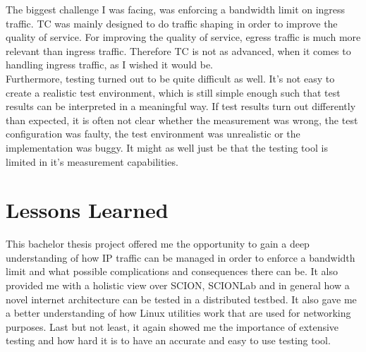 The biggest challenge I was facing, was enforcing a bandwidth limit on ingress traffic. \acs{TC} was mainly designed to do traffic shaping in order to improve the quality of service. For improving the quality of service, egress traffic is much more relevant than ingress traffic. Therefore \acs{TC} is not as advanced, when it comes to handling ingress traffic, as I wished it would be.
\\
Furthermore, testing turned out to be quite difficult as well. It's not easy to create a realistic test environment, which is still simple enough such that test results can be interpreted in a meaningful way. If test results turn out differently than expected, it is often not clear whether the measurement was wrong, the test configuration was faulty, the test environment was unrealistic or the implementation was buggy. It might as well just be that the testing tool is limited in it's measurement capabilities. 

\section{Lessons Learned}

This bachelor thesis project offered me the opportunity to gain a deep understanding of how \acs{IP} traffic can be managed in order to enforce a bandwidth limit and what possible complications and consequences there can be. It also provided me with a holistic view over \acs{SCION}, \acs{SCIONLab} and in general how a novel internet architecture can be tested in a distributed testbed. It also gave me a better understanding of how Linux utilities work that are used for networking purposes. Last but not least, it again showed me the importance of extensive testing and how hard it is to have an accurate and easy to use testing tool.
